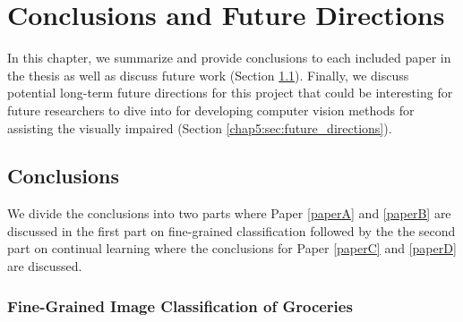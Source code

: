 
\chapter{Conclusions and Future Directions}\label{chap5}

In this chapter, we summarize and provide conclusions to each included paper in the thesis as well as discuss future work (Section \ref{chap5:sec:conclusions}). Finally, we discuss potential long-term future directions for this project that could be interesting for future researchers to dive into for developing computer vision methods for assisting the visually impaired (Section \ref{chap5:sec:future_directions}).

\section{Conclusions}\label{chap5:sec:conclusions}

We divide the conclusions into two parts where Paper \ref{paperA} and \ref{paperB} are discussed in the first part on fine-grained classification followed by the the second part on continual learning where the conclusions for Paper \ref{paperC} and \ref{paperD} are discussed.

\subsection{Fine-Grained Image Classification of Groceries}

